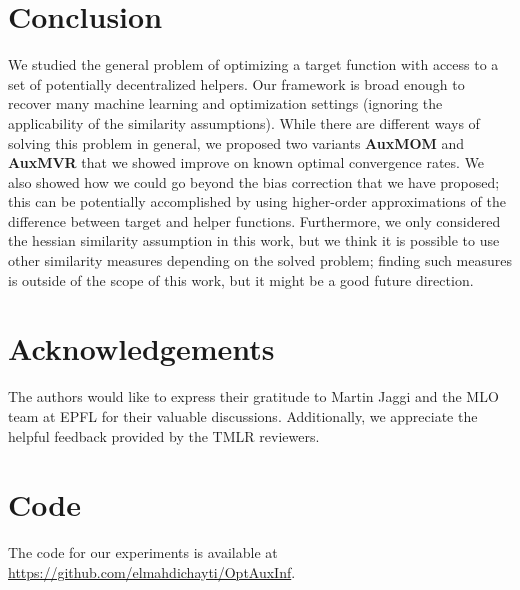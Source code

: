 \documentclass[10pt]{article} %
\theoremstyle{plain}
\theoremstyle{definition}
\theoremstyle{remark}
\begin{document}
\section{Conclusion}
We studied the general problem of optimizing a target function with access to a set of potentially decentralized helpers. Our framework is broad enough to recover many machine learning and optimization settings (ignoring the applicability of the similarity assumptions). While there are different ways of solving this problem in general, we proposed two variants \textbf{AuxMOM} and \textbf{AuxMVR} that we showed improve on known optimal convergence rates. We also showed how we could go beyond the bias correction that we have proposed; this can be potentially accomplished by using higher-order approximations of the difference between target and helper functions. Furthermore, we only considered the hessian similarity assumption in this work, but we think it is possible to use other similarity measures depending on the solved problem; finding such measures is outside of the scope of this work, but it might be a good future direction. 





\section{Acknowledgements}
The authors would like to express their gratitude to Martin Jaggi and the MLO team at EPFL for their valuable discussions. Additionally, we appreciate the helpful feedback provided by the TMLR reviewers.


\newpage




\appendix
\section{Code}

The code for our experiments is available at \url{https://github.com/elmahdichayti/OptAuxInf}.
\end{document}
